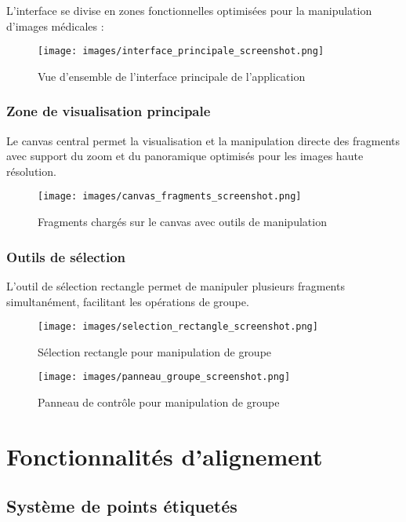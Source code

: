 \documentclass[11pt,a4paper]{report}
\begin{document}
L'interface se divise en zones fonctionnelles optimisées pour la manipulation d'images médicales :

\begin{figure}[htbp]
\centering
\texttt{[image: images/interface\_principale\_screenshot.png]}
\caption{Vue d'ensemble de l'interface principale de l'application}
\end{figure}

\subsubsection{Zone de visualisation principale}

Le canvas central permet la visualisation et la manipulation directe des fragments avec support du zoom et du panoramique optimisés pour les images haute résolution.

\begin{figure}[htbp]
\centering
\texttt{[image: images/canvas\_fragments\_screenshot.png]}
\caption{Fragments chargés sur le canvas avec outils de manipulation}
\end{figure}

\subsubsection{Outils de sélection}

L'outil de sélection rectangle permet de manipuler plusieurs fragments simultanément, facilitant les opérations de groupe.

\begin{figure}[htbp]
\centering
\texttt{[image: images/selection\_rectangle\_screenshot.png]}
\caption{Sélection rectangle pour manipulation de groupe}
\end{figure}

\begin{figure}[htbp]
\centering
\texttt{[image: images/panneau\_groupe\_screenshot.png]}
\caption{Panneau de contrôle pour manipulation de groupe}
\end{figure}

\section{Fonctionnalités d'alignement}

\subsection{Système de points étiquetés}
\end{document}
